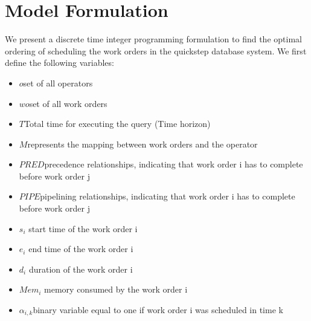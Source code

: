 \documentclass[20pt]{sigchi}
\begin{document}
\section{Model Formulation}
We present a discrete time integer programming formulation to find the optimal ordering of scheduling the work orders in the quickstep database system. We first define the following variables:
\begin {itemize}
\item []\hspace{1em}$o$\hspace{1em}set of all operators
\item[] \hspace{1em}$wo$\hspace{1em}set of all work orders 
\item[] \hspace{1em}$T$\hspace{1em}Total time  for executing the query (Time horizon)
\item[] \hspace{1em}$M$\hspace{1em}represents the mapping between work orders and the  operator
\item[] \hspace{1em}$PRED$\hspace{1em}precedence relationships, indicating that work order i has to complete before work order j
\item[] \hspace{1em}$PIPE$\hspace{1em}pipelining relationships, indicating that work order i has to complete before work order j
\item[] \hspace{1em}$s_{i}$\hspace{1em} start time of the work order i
\item[] \hspace{1em}$e_{i}$\hspace{1em} end time of the work order i
\item[] \hspace{1em}$d_{i}$\hspace{1em} duration of the work order i
\item[] \hspace{1em}$Mem_{i}$\hspace{1em} memory consumed by the work order i
\item []\hspace{1em}$\alpha_{i,k}$\hspace{1em}binary variable equal to one if  work order i was scheduled in time k

\end{itemize}
\end{document}
